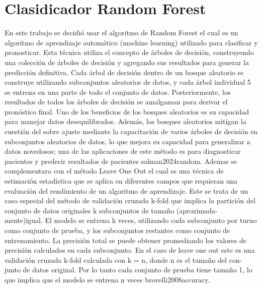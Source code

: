 \section{Clasidicador Random Forest}
En este trabajo se decidió usar el algoritmo de Random Forest el cual es un algoritmo de
aprendizaje automático (machine learning) utilizado para clasificar y pronosticar. Esta técnica
utiliza el concepto de árboles de decisión, construyendo una colección de árboles de decisión y
agregando sus resultados para generar la predicción definitiva. Cada árbol de decisión dentro de un
bosque aleatorio se construye utilizando subconjuntos aleatorios de datos, y cada árbol individual
5
se entrena en una parte de todo el conjunto de datos. Posteriormente, los resultados de todos
los árboles de decisión se amalgaman para derivar el pronóstico final. Uno de los beneficios de
los bosques aleatorios es su capacidad para manejar datos desequilibrados. Además, los bosques
aleatorios mitigan la cuestión del sobre ajuste mediante la capacitación de varios árboles de decisión
en subconjuntos aleatorios de datos, lo que mejora su capacidad para generalizar a datos novedosos;
una de las aplicaciones de este método es para diagnosticar pacientes y predecir resultados de
pacientes salman2024random.
Ademas se complementara con el método Leave One Out el cual es una técnica de estimación
estadística que se aplica en diferentes campos que requieran una evaluación del rendimiento de un
algoritmo de aprendizaje. Este se trata de un caso especial del método de validación cruzada k-fold
que implica la partición del conjunto de datos originales k subconjuntos de tamaño (aproximada-
mente)igual. El modelo se entrena k veces, utilizando cada subconjunto por turno como conjunto de
prueba, y los subconjuntos restantes como conjunto de entrenamiento. La precisión total se puede
obtener promediando los valores de precisión calculados en cada subconjunto. En el caso de leave
one out este es una validación cruzada k-fold calculada con k = n, donde n es el tamaño del con-
junto de datos original. Por lo tanto cada conjunto de prueba tiene tamaño 1, lo que implica que el
modelo se entrena n veces brovelli2008accuracy.
